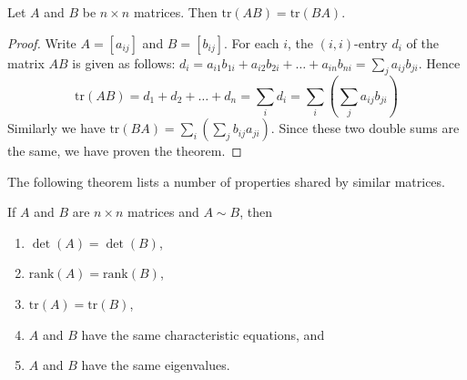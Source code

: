 \documentclass{ximera}
\begin{document}
\begin{theorem}\label{th:trAB=trBA}
Let $A$ and $B$ be $n \times n$ matrices. Then $\mbox{tr}(AB) = \mbox{tr}(BA)$.
\end{theorem}
 
\begin{proof}
Write $A = [a_{ij}]$ and $B = [b_{ij}]$. For each $i$, the $(i, i)$-entry $d_{i}$ of the matrix $AB$ is given as follows: $d_{i} = a_{i1}b_{1i} + a_{i2}b_{2i} + \dots + a_{in}b_{ni} = \sum_{j}a_{ij}b_{ji}$. Hence
\begin{equation*}
\mbox{tr}(AB) = d_1 + d_2 + \dots + d_n = \sum_{i}d_i = \sum_{i}\left(\sum_{j}a_{ij}b_{ji}\right)
\end{equation*}
Similarly we have $\mbox{tr}(BA) = \sum_{i}\left(\sum_{j}b_{ij}a_{ji}\right)$. Since these two double sums are the same, we have proven the theorem.
\end{proof}
 
The following theorem lists a number of properties shared by similar matrices.
 
\begin{theorem}\label{th:properties_similar}
If $A$ and $B$ are $n\times n$ matrices and $A\sim B$, then
\begin{enumerate}
\item\label{th:properties_similar_det} $\det(A) = \det(B)$,
\item\label{th:properties_similar_rank} $\mbox{rank}(A) = \mbox{rank}(B)$,
\item\label{th:properties_similar_trace} $\mbox{tr}(A)= \mbox{tr}(B)$,
\item\label{th:properties_similar_char_poly} $A$ and $B$ have the same characteristic equations, and
\item\label{th:properties_similar_eig} $A$ and $B$ have the same eigenvalues.
\end{enumerate}
\end{theorem}
 
\end{document}
